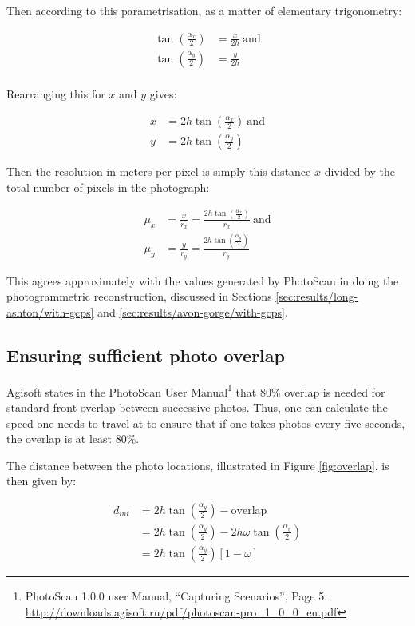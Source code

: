 Then according to this parametrisation, as a matter of elementary trigonometry:

\begin{align}
    \tan\left(\frac{\alpha_x}{2}\right) &= \frac{x}{2h} ~\mathrm{and} \\
    \tan\left(\frac{\alpha_y}{2}\right) &= \frac{y}{2h} \\
\end{align}

Rearranging this for $x$ and $y$ gives:

\begin{align}
    x &= 2h\tan\left(\frac{\alpha_x}{2}\right) ~\mathrm{and} \\
    y &= 2h\tan\left(\frac{\alpha_y}{2}\right)
\end{align}

Then the resolution in meters per pixel is simply this distance $x$ divided by
the total number of pixels in the photograph:

\begin{align}
    \mu_x &= \frac{x}{r_x} = \frac{2h\tan\left(\frac{\alpha_x}{2}\right)}{r_x}
    ~\mathrm{and} \\
    \mu_y &= \frac{y}{r_y} = \frac{2h\tan\left(\frac{\alpha_y}{2}\right)}{r_y}
\end{align}

This agrees approximately with the values generated by PhotoScan in doing the
photogrammetric reconstruction, discussed in Sections
\ref{sec:results/long-ashton/with-gcps} and
\ref{sec:results/avon-gorge/with-gcps}.

\subsection{Ensuring sufficient photo overlap}

Agisoft states in the PhotoScan User Manual\footnote{PhotoScan 1.0.0 user
Manual, ``Capturing Scenarios'', Page 5.
\url{http://downloads.agisoft.ru/pdf/photoscan-pro\_1\_0\_0\_en.pdf}} that 80\%
overlap is needed for standard front overlap between successive photos. Thus,
one can calculate the speed one needs to travel at to ensure that if one takes
photos every five seconds, the overlap is at least 80\%.

The distance between the photo locations, illustrated in Figure
\ref{fig:overlap}, is then given by:

\begin{align}
    d_{int} &= 2h\tan\left(\frac{\alpha_y}{2}\right) - \mathrm{overlap} \\
            &= 2h\tan\left(\frac{\alpha_y}{2}\right) -
                   2h\omega\tan\left(\frac{\alpha_y}{2}\right) \\
            &= 2h\tan\left(\frac{\alpha_y}{2}\right)\left[ 1 - \omega \right]
\end{align}

